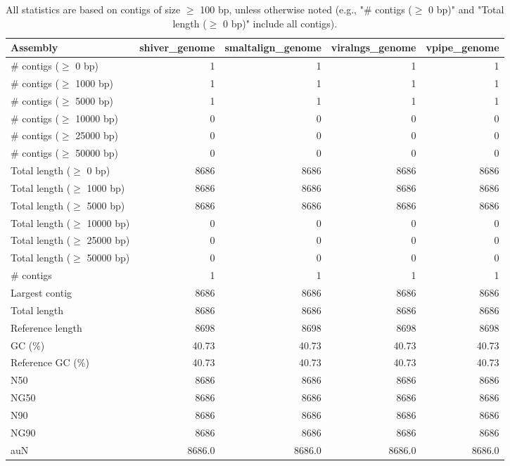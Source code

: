 \documentclass[12pt,a4paper]{article}
\begin{document}
\begin{table}[ht]
\begin{center}
\caption{All statistics are based on contigs of size $\geq$ 100 bp, unless otherwise noted (e.g., "\# contigs ($\geq$ 0 bp)" and "Total length ($\geq$ 0 bp)" include all contigs).}
\begin{tabular}{|l*{4}{|r}|}
\hline
Assembly & shiver\_genome & smaltalign\_genome & viralngs\_genome & vpipe\_genome \\ \hline
\# contigs ($\geq$ 0 bp) & 1 & 1 & 1 & 1 \\ \hline
\# contigs ($\geq$ 1000 bp) & 1 & 1 & 1 & 1 \\ \hline
\# contigs ($\geq$ 5000 bp) & 1 & 1 & 1 & 1 \\ \hline
\# contigs ($\geq$ 10000 bp) & 0 & 0 & 0 & 0 \\ \hline
\# contigs ($\geq$ 25000 bp) & 0 & 0 & 0 & 0 \\ \hline
\# contigs ($\geq$ 50000 bp) & 0 & 0 & 0 & 0 \\ \hline
Total length ($\geq$ 0 bp) & 8686 & 8686 & 8686 & 8686 \\ \hline
Total length ($\geq$ 1000 bp) & 8686 & 8686 & 8686 & 8686 \\ \hline
Total length ($\geq$ 5000 bp) & 8686 & 8686 & 8686 & 8686 \\ \hline
Total length ($\geq$ 10000 bp) & 0 & 0 & 0 & 0 \\ \hline
Total length ($\geq$ 25000 bp) & 0 & 0 & 0 & 0 \\ \hline
Total length ($\geq$ 50000 bp) & 0 & 0 & 0 & 0 \\ \hline
\# contigs & 1 & 1 & 1 & 1 \\ \hline
Largest contig & 8686 & 8686 & 8686 & 8686 \\ \hline
Total length & 8686 & 8686 & 8686 & 8686 \\ \hline
Reference length & 8698 & 8698 & 8698 & 8698 \\ \hline
GC (\%) & 40.73 & 40.73 & 40.73 & 40.73 \\ \hline
Reference GC (\%) & 40.73 & 40.73 & 40.73 & 40.73 \\ \hline
N50 & 8686 & 8686 & 8686 & 8686 \\ \hline
NG50 & 8686 & 8686 & 8686 & 8686 \\ \hline
N90 & 8686 & 8686 & 8686 & 8686 \\ \hline
NG90 & 8686 & 8686 & 8686 & 8686 \\ \hline
auN & 8686.0 & 8686.0 & 8686.0 & 8686.0 \\ \hline

\end{tabular}
\end{center}
\end{table}
\end{document}
